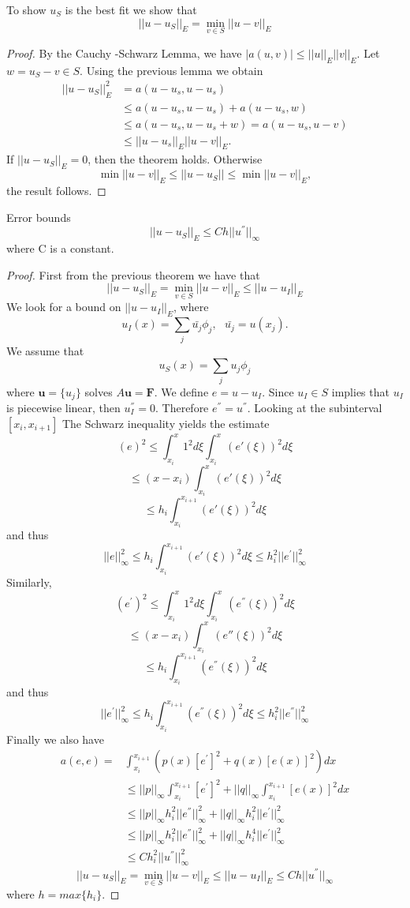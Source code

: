 \begin{theorem}
To show $u_{S}$ is the best fit we show that
\[||u-u_S||_E = \min_{v\in S}||u-v||_E \]
\end{theorem}
\begin{proof}
By the Cauchy -Schwarz Lemma, we have $|a(u,v)|\leq ||u||_E||v||_E$.
Let $w=u_S-v \in S$. Using the previous lemma we obtain
\[\begin{array}{ll}
||u-u_S||^2_E & = a(u-u_s,u-u_s)\\
& \leq a(u-u_s,u-u_s)+a(u-u_s,w)\\
& \leq a(u-u_s,u-u_s+w)=a(u-u_s,u-v)\\
& \leq ||u-u_s||_{E}||u-v||_E.
\end{array} \]
If $||u-u_S ||_E=0$, then the theorem holds. Otherwise
\[\min ||u-v||_E\leq ||u-u_S|| \leq \min||u-v||_E, \]
the result follows.
\end{proof}
\begin{theorem}
Error bounds
\[||u-u_S||_E \leq C h||u^{''}||_\infty\]
where C is a constant.
\end{theorem}
\begin{proof}
First from the previous theorem we have that
\[||u-u_S||_E = \min_{v\in S}||u-v||_E \leq ||u-u_I||_E\]
We look for a bound on $||u-u_I||_E$, where 
\[u_{I}(x) = \sum_j \bar{u_j} \phi_j, \ \ \ \bar{u_j}=u(x_j). \]
We assume that 
\[u_{S}(x) = \sum_j u_j \phi_j\] 
where $\mathbf{u}=\{u_j\}$ solves $A\mathbf{u}=\mathbf{F}$.
We define $e=u-u_I$. Since $u_I\in S$ implies that $u_I$ is piecewise
linear, then $u^{''}_I=0$. Therefore $e^{''}=u^{''}$.
Looking at the subinterval $[x_i,x_{i+1}]$
The Schwarz inequality yields the estimate
\[(e)^2 \leq \int_{x_i}^x 1^2 d \xi \int_{x_i}^{x}(e'(\xi))^2d \xi \]
\[ \leq (x-x_i) \int_{x_i}^{x}(e'(\xi))^2d \xi \]
\[ \leq h_i \int_{x_i}^{x_{i+1}}(e'(\xi))^2d \xi \]
and thus 
\[||e||^2_{\infty} \leq  h_i \int_{x_i}^{x_{i+1}}(e'(\xi))^2d \xi\leq h_i^2 ||e^{'}||^2_{\infty} \]
Similarly,
\[(e^{'})^2 \leq \int_{x_i}^x 1^2 d \xi \int_{x_i}^{x}(e^{''}(\xi))^2d \xi \]
\[ \leq (x-x_i) \int_{x_i}^{x}(e{''}(\xi))^2d \xi \]
\[ \leq h_i \int_{x_i}^{x_{i+1}}(e^{''}(\xi))^2d \xi \]
and thus 
\[||e^{'}||^2_{\infty} \leq  h_i \int_{x_i}^{x_{i+1}}(e^{''}(\xi))^2d \xi\leq h_i^2 ||e^{''}||^2_{\infty} \]
Finally we also have
\[
\begin{array}{ll}
a(e,e) =& \int_{x_i}^{x_{i+1}} (p(x)[e^{'}]^2 +q(x)[e(x)]^2)dx \\
& \leq ||p||_{\infty}\int_{x_i}^{x_{i+1}} [e^{'}]^2 +||q||_{\infty}\int_{x_i}^{x_{i+1}} [e(x)]^2dx \\
& \leq ||p||_{\infty}h_i^2 ||e^{''}||^2_{\infty}+||q||_{\infty}h_i^2 ||e^{'}||^2_{\infty} \\
& \leq ||p||_{\infty}h_i^2 ||e^{''}||^2_{\infty}+||q||_{\infty}h_i^4 ||e^{'}||^2_{\infty} \\
& \leq C h_i^2 ||u^{''}||^2_{\infty}
\end{array}
\]
\[||u-u_S||_E = \min_{v\in S}||u-v||_E \leq ||u-u_I||_E \leq C h ||u^{''}||_{\infty}
 \]
where $h=max\{h_{i}\}$.
\end{proof}


